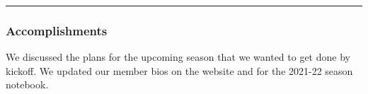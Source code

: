 \noindent\hfil\rule{\textwidth}{.4pt}\hfil

\subsubsection*{Accomplishments}
We discussed the plans for the upcoming season that we wanted to get done by kickoff. We updated our member bios on the website and for the 2021-22 season notebook. 

